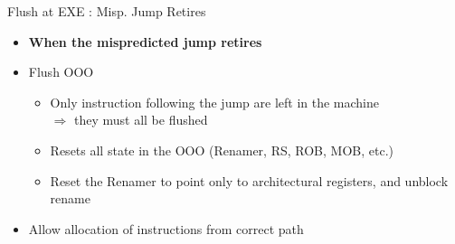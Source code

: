 \documentclass[aspectratio=169,12pt]{beamer}
\begin{document}
\begin{frame}{Flush at EXE : Misp. Jump Retires}
    \centering
    \vspace{1cm}

    
    \vspace{0.5cm}
    \begin{itemize}
        \item[] \textbf{When the mispredicted jump retires}
        \item Flush OOO
        \begin{itemize}
            \item Only instruction following the jump are left in the machine \\
            $\Rightarrow$ they must all be flushed
            \item Resets all state in the OOO (Renamer, RS, ROB, MOB, etc.)
            \item Reset the Renamer to point only to architectural registers, and unblock rename
        \end{itemize}
        \item Allow allocation of instructions from correct path
    \end{itemize}
\end{frame}
\end{document}
